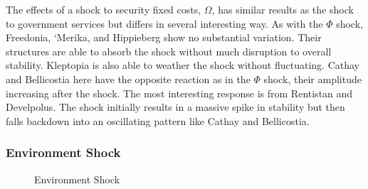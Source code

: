 \documentclass[12pt]{article}
\begin{document}
\begin{spacing}{1.5}
\begin{figure}
\end{figure}

The effects of a shock to security fixed costs, $\Omega$, has similar results as the shock to government services but differs in several interesting way. As with the $\Phi$ shock, Freedonia, `Merika, and Hippieberg show no substantial variation. Their structures are able to absorb the shock without much disruption to overall stability. Kleptopia is also able to weather the shock without fluctuating. Cathay and Bellicostia here have the opposite reaction as in the $\Phi$ shock, their amplitude increasing after the shock. The most interesting response is from Rentistan and Develpolus. The shock initially results in a massive spike in stability but then falls backdown into an oscillating pattern like Cathay and Bellicostia. 

\subsubsection{Environment Shock}

\begin{figure}
\centering
{} 
\caption{Environment Shock}


\end{figure}
\end{spacing}
\end{document}
